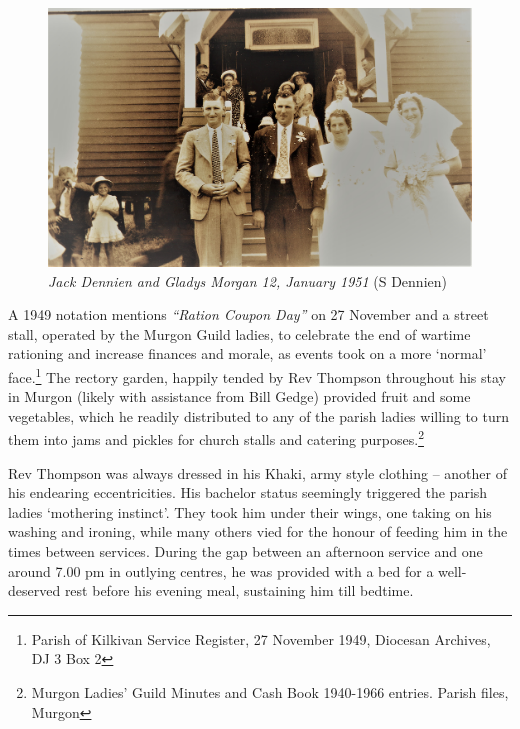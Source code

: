 \begin{figure}[!htb]
\begin{center}
\includegraphics[width=1.\textwidth,center]{../images/JackDennienGladysMorgan12Jan1951.jpg}
\caption{{\itshape Jack Dennien and Gladys Morgan 12, January 1951} {\scriptsize(S Dennien)}}
\end{center}
\end{figure}




A 1949 notation mentions \emph{``Ration Coupon Day''} on 27 November and a street stall, operated by the Murgon Guild ladies, to celebrate the end of wartime rationing and increase finances and morale, as events took on a more `normal' face.\footnote{Parish of Kilkivan Service Register, 27 November 1949, Diocesan Archives, DJ 3 Box 2} The rectory garden, happily tended by Rev Thompson throughout his stay in Murgon (likely with assistance from Bill Gedge) provided fruit and some vegetables, which he readily distributed to any of the parish ladies willing to turn them into jams and pickles for church stalls and catering purposes.\footnote{Murgon Ladies' Guild Minutes and Cash Book 1940-1966 entries. Parish files, Murgon}


Rev Thompson was always dressed in his Khaki, army style clothing -- another of his endearing eccentricities. His bachelor status seemingly triggered the parish ladies `mothering instinct'. They took him under their wings, one taking on his washing and ironing, while many others vied for the honour of feeding him in the times between services. During the gap between an afternoon service and one around 7.00 pm in outlying centres, he was provided with a bed for a well-deserved rest before his evening meal, sustaining him till bedtime.



